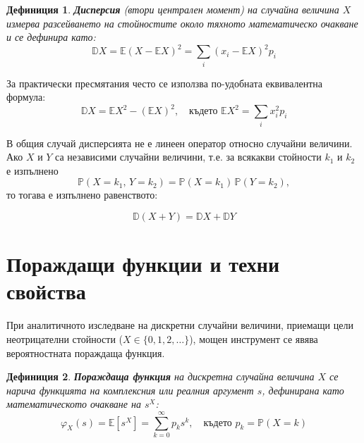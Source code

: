 \documentclass{scrartcl}
\newtheorem{definition}{Дефиниция}
\begin{document}
\begin{FlushLeft}
\begin{definition}
\textbf{Дисперсия} (втори централен момент) на случайна величина $X$ измерва разсейването на стойностите около тяхното математическо очакване и се дефинира като:
\[ \mathbb{D}X = \mathbb{E}(X - \mathbb{E}X)^2 = \sum_{i} (x_i - \mathbb{E}X)^2 p_i \]
\end{definition}
За практически пресмятания често се използва по-удобната еквивалентна формула:
\[ \mathbb{D}X = \mathbb{E}X^2 - (\mathbb{E}X)^2, \quad \text{където } \mathbb{E}X^2 = \sum_{i} x_i^2 p_i \]

В общия случай дисперсията не е линеен оператор относно случайни величини.
Ако $X$ и $Y$ са независими случайни величини, т.е. за всякакви стойности $k_1$ и $k_2$ е изпълнено
\[
\mathbb{P}(X = k_1,\, Y = k_2) = \mathbb{P}(X = k_1)\,\mathbb{P}(Y = k_2),
\]
то тогава е изпълнено равенството:

$$\mathbb{D}(X + Y) = \mathbb{D}X + \mathbb{D}Y$$

\section{Пораждащи функции и техни свойства}

При аналитичното изследване на дискретни случайни величини, приемащи цели неотрицателни стойности ($X \in \{0, 1, 2, \dots\}$), мощен инструмент се явява вероятностната пораждаща функция.

\begin{definition}
\textbf{Пораждаща функция} на дискретна случайна величина $X$ се нарича функцията на комплексния или реалния аргумент $s$, дефинирана като математическото очакване на $s^X$:
\[ \varphi_X(s) = \mathbb{E}[s^X] = \sum_{k=0}^{\infty} p_k s^k, \quad \text{където } p_k = \mathbb{P}(X = k) \]
\end{definition}


\end{FlushLeft}
\end{document}

